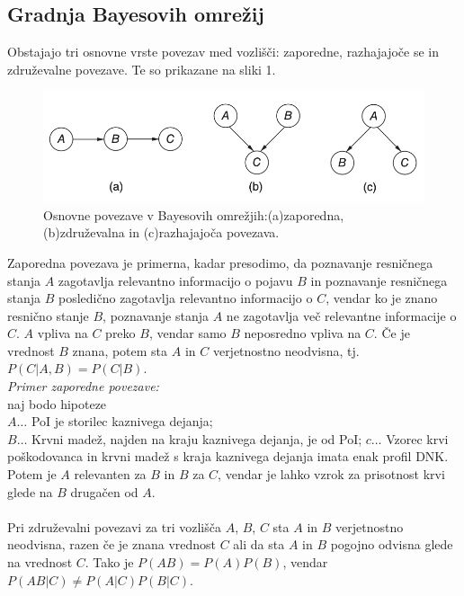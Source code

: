 \documentclass[12pt,a4paper]{amsart}
\theoremstyle{definition} %
\theoremstyle{plain} %
\begin{document}
\subsection{Gradnja Bayesovih omrežij}
Obstajajo tri osnovne vrste povezav med vozlišči: zaporedne, razhajajoče se in združevalne povezave. Te so prikazane na sliki 1. \\
\begin{figure}[!ht]\label{fig:slika2}
   \centering
   \includegraphics[scale=0.60]{slika4.png}
   \caption{Osnovne povezave v Bayesovih omrežjih:(a)zaporedna, (b)združevalna in (c)razhajajoča povezava.}\vspace{2mm}
\end{figure}
Zaporedna povezava je primerna, kadar presodimo, da poznavanje resničnega stanja $A$ zagotavlja relevantno informacijo o pojavu $B$ in poznavanje
resničnega stanja $B$ posledično zagotavlja relevantno informacijo o $C$, vendar ko je znano resnično stanje $B$, poznavanje stanja $A$ ne
zagotavlja več relevantne informacije o $C$. $A$ vpliva na $C$ preko $B$, vendar samo $B$ neposredno vpliva na $C$. Če je vrednost $B$ znana,
potem sta $A$ in $C$ verjetnostno neodvisna, tj. $P(C \lvert A, B) = P(C \lvert B)$.\\
\textit{Primer zaporedne povezave:\\} naj bodo hipoteze\\
$A \dots$ PoI je storilec kaznivega dejanja;\\
$B \dots$ Krvni madež, najden na kraju kaznivega dejanja, je od PoI;
$c \dots$ Vzorec krvi poškodovanca in krvni madež s kraja kaznivega dejanja imata enak profil DNK. \\
Potem je $A$ relevanten za $B$ in $B$ za $C$, vendar je lahko vzrok za prisotnost krvi glede na $B$ drugačen od $A$.\\\\
Pri združevalni povezavi za tri vozlišča $A$, $B$, $C$ sta $A$ in $B$ verjetnostno neodvisna, razen če je znana vrednost $C$ ali da sta $A$ in $B$
pogojno odvisna glede na vrednost $C$. Tako je $P(AB) = P(A) P(B)$, vendar $P(AB \lvert C) \ne P(A \lvert C) P(B \lvert C)$.\\
\end{document}
